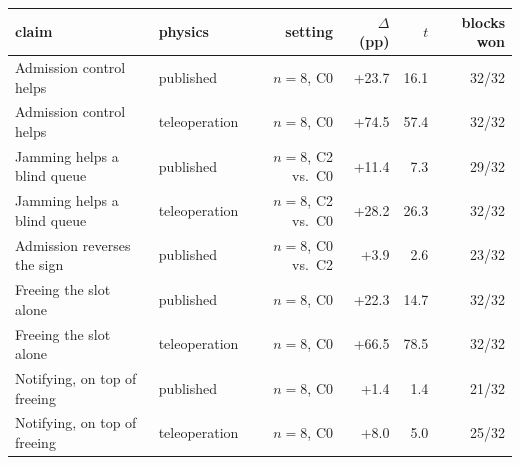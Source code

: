 \begin{tabular}{llrrrr}
\toprule
claim & physics & setting & $\Delta$ (pp) & $t$ & blocks won \\
\midrule
Admission control helps & published & $n{=}8$, C0 & +23.7 & 16.1 & 32/32 \\
Admission control helps & teleoperation & $n{=}8$, C0 & +74.5 & 57.4 & 32/32 \\
Jamming helps a blind queue & published & $n{=}8$, C2 vs.\ C0 & +11.4 & 7.3 & 29/32 \\
Jamming helps a blind queue & teleoperation & $n{=}8$, C2 vs.\ C0 & +28.2 & 26.3 & 32/32 \\
Admission reverses the sign & published & $n{=}8$, C0 vs.\ C2 & +3.9 & 2.6 & 23/32 \\
Freeing the slot alone & published & $n{=}8$, C0 & +22.3 & 14.7 & 32/32 \\
Freeing the slot alone & teleoperation & $n{=}8$, C0 & +66.5 & 78.5 & 32/32 \\
Notifying, on top of freeing & published & $n{=}8$, C0 & +1.4 & 1.4 & 21/32 \\
Notifying, on top of freeing & teleoperation & $n{=}8$, C0 & +8.0 & 5.0 & 25/32 \\
\bottomrule
\end{tabular}
